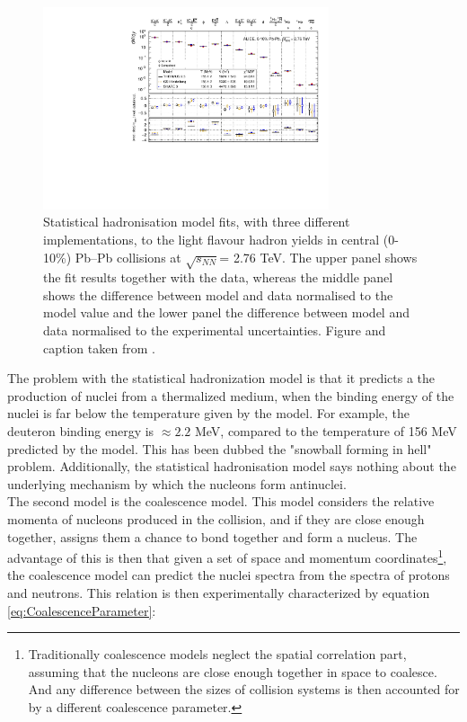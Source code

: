 \begin{figure}
    \centering
    \includegraphics[width=0.75\textwidth]{figures/Fit_PbPb0010_GSITHERMUSSHARE_new_alpha_fixed-91746.pdf}
    \caption{Statistical hadronisation model fits, with three different implementations, to the light flavour hadron yields in central (0-10\%) Pb--Pb collisions at $\sqrt{s_{NN}}$= 2.76 TeV. The upper panel shows the fit results together with the data, whereas the middle panel shows the difference between model and data normalised to the model value and the lower panel the difference between model and data normalised to the experimental uncertainties. Figure and caption taken from \cite{4He_PbPb}.}
    \label{fig:Stat_Hadron_model}
\end{figure}

The problem with the statistical hadronization model is that it predicts a the production of nuclei from a thermalized medium, when the binding energy of the nuclei is far below the temperature given by the model. For example, the deuteron binding energy is $\approx 2.2$ MeV, compared to the temperature of 156 MeV predicted by the model. This has been dubbed the "snowball forming in hell" problem. Additionally, the statistical hadronisation model says nothing about the underlying mechanism by which the nucleons form antinuclei. \\

The second model is the coalescence model. This model considers the relative momenta of nucleons produced in the collision, and if they are close enough together, assigns them a chance to bond together and form a nucleus. The advantage of this is then that given a set of space and momentum coordinates\footnote{Traditionally coalescence models neglect the spatial correlation part, assuming that the nucleons are close enough together in space to coalesce. And any difference between the sizes of collision systems is then accounted for by a different coalescence parameter.}, the coalescence model can predict the nuclei spectra from the spectra of protons and neutrons. This relation is then experimentally characterized by equation \ref{eq:CoalescenceParameter}:

